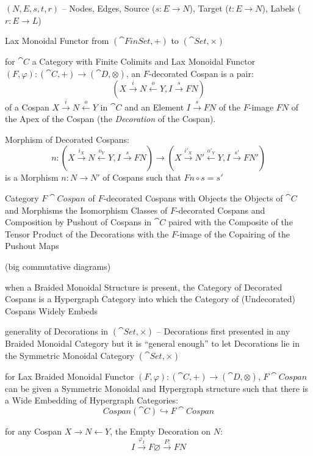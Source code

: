 $(N,E,s,t,r)$ -- Nodes, Edges, Source ($s : E \rightarrow N$), Target
($t : E \rightarrow N$), Labels ($r : E \rightarrow L$)

Lax Monoidal Functor from $(\cat{FinSet},+)$ to $(\cat{Set}, \times)$


for $\cat{C}$ a Category with Finite Colimits and Lax Monoidal Functor
$(F, \varphi) : (\cat{C}, +) \rightarrow (\cat{D}, \otimes)$, an
$F$-decorated Cospan is a pair:
\[
  (X \xrightarrow{i} N \xleftarrow{o} Y, I \xrightarrow{s} F N)
\]
of a Cospan $X \xrightarrow{i} N \xleftarrow{o} Y$ in $\cat{C}$ and an
Element $I \xrightarrow{s} F N$ of the $F$-image $F N$ of the Apex of
the Cospan (the \emph{Decoration} of the Cospan).

Morphism of Decorated Cospans:
\[
  n: (X \xrightarrow{i_X} N \xleftarrow{o_Y} Y, I \xrightarrow{s} F N)
    \rightarrow (X \xrightarrow{i'_X} N' \xleftarrow{o'_Y} Y,
      I \xrightarrow{s'} F N')
\]
is a Morphism $n : N \rightarrow N'$ of Cospans such that $F n \circ s
= s'$

Category $F\cat{Cospan}$ of $F$-decorated Cospans with Objects the
Objects of $\cat{C}$ and Morphisms the Isomorphism Classes of
$F$-decorated Cospans and Composition by Pushout of Cospans in
$\cat{C}$ paired with the Composite of the Tensor Product of the
Decorations with the $F$-image of the Copairing of the Pushout Maps

(big commutative diagrams) %

when a Braided Monoidal Structure is present, the Category of
Decorated Cospans is a Hypergraph Category into which the Category of
(Undecorated) Cospans Widely Embeds

generality of Decorations in $(\cat{Set}, \times)$ -- Decorations
first presented in any Braided Monoidal Category but it is ``general
enough'' to let Decorations lie in the Symmetric Monoidal Category
$(\cat{Set}, \times)$ %

for Lax Braided Monoidal Functor $(F,\varphi): (\cat{C},+) \rightarrow
(\cat{D},\otimes)$, $F\cat{Cospan}$ can be given a Symmetric Monoidal
and Hypergraph structure such that there is a Wide Embedding of
Hypergraph Categories:
\[
  Cospan(\cat{C}) \hookrightarrow F\cat{Cospan}
\]

for any Cospan $X \rightarrow N \leftarrow Y$, the Empty Decoration on
$N$:
\[
  I \xrightarrow{\varphi_I} F \varnothing \xrightarrow{F!} F N
\]


